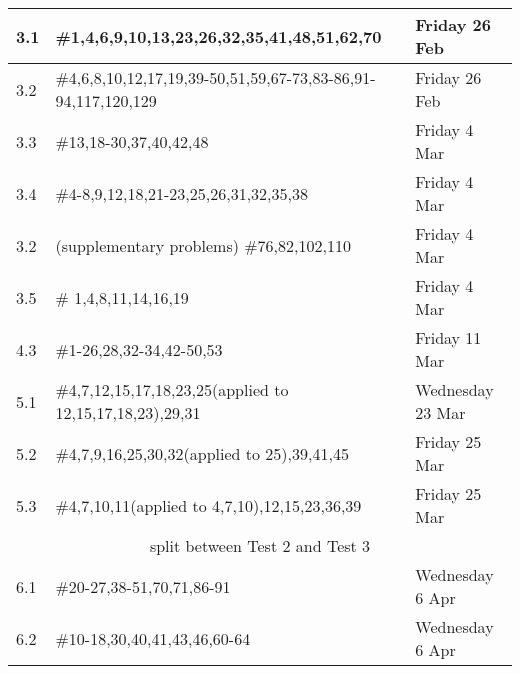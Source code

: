 \documentclass[11pt]{article}
\begin{document}
\begin{tabular}{|p{1.6cm}|p{12cm}|p{3cm}|}
\hline
3.1&\#1,4,6,9,10,13,23,26,32,35,41,48,51,62,70& Friday 26 Feb\\
\hline
3.2&\#4,6,8,10,12,17,19,39-50,51,59,67-73,83-86,91-94,117,120,129&Friday 26 Feb\\
\hline
3.3&\#13,18-30,37,40,42,48&Friday 4 Mar\\
\hline
3.4&\#4-8,9,12,18,21-23,25,26,31,32,35,38&Friday 4 Mar\\
\hline
3.2&(supplementary problems) \#76,82,102,110&Friday 4 Mar\\
\hline
3.5&\# 1,4,8,11,14,16,19& Friday 4 Mar\\
\hline
4.3& \#1-26,28,32-34,42-50,53& Friday 11 Mar\\
\hline
5.1&\#4,7,12,15,17,18,23,25(applied to 12,15,17,18,23),29,31& Wednesday 23 Mar\\
\hline
5.2&\#4,7,9,16,25,30,32(applied to 25),39,41,45&Friday 25 Mar\\
\hline
5.3&\#4,7,10,11(applied to 4,7,10),12,15,23,36,39&Friday 25 Mar\\
\hline
\hline
\multicolumn{3}{c}{split between Test 2 and Test 3}\\
\hline
6.1&\#20-27,38-51,70,71,86-91&Wednesday 6 Apr\\
\hline
6.2& \#10-18,30,40,41,43,46,60-64& Wednesday 6 Apr\\
\hline
\end{tabular}
\end{document}
